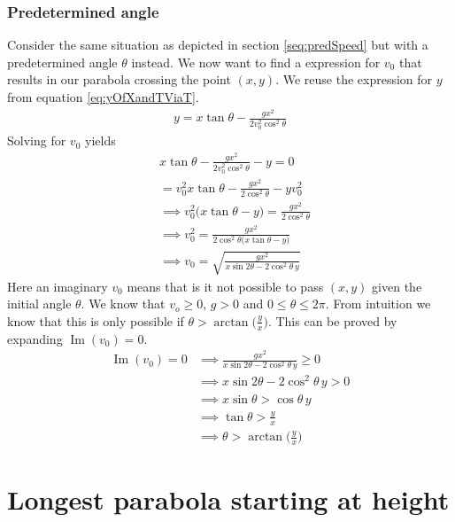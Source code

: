 \documentclass[%
aip,
jmp,
amsmath,amssymb,
reprint,%
]{revtex4-1}
\begin{document}
	\subsubsection{Predetermined angle}
	Consider the same situation as depicted in section \ref{seq:predSpeed} but with a predetermined angle $\theta$ instead. We now want to find a expression for $v_0$ that results in our parabola crossing the point $(x,y)$. We reuse the expression for $y$ from equation \eqref{eq:yOfXandTViaT}.
	\begin{align}\nonumber
		y = x\tan\theta - \frac{gx^2}{2v_{0}^2\cos^2\theta}
	\end{align}
	Solving for $v_0$ yields
	\begin{align}\nonumber
		&x\tan\theta - \frac{gx^2}{2v_{0}^2\cos^2\theta}-y = 0\\\nonumber
		&= v_{0}^2x\tan\theta-\frac{gx^2}{2\cos^2\theta}-yv_{0}^2\\\nonumber
		&\implies v_{0}^2\big(x\tan\theta-y\big)=\frac{gx^2}{2\cos^2\theta} \\\nonumber
		&\implies v_{0}^2=\frac{gx^2}{2\cos^2\theta\big(x\tan\theta-y\big)} \\\nonumber
		&\implies v_0 = \sqrt{\frac{gx^2}{x\sin2\theta-2\cos^2\theta\,y}}\nonumber
	\end{align}
	Here an imaginary $v_0$ means that is it not possible to pass $(x, y)$ given the initial angle $\theta$. We know that $v_o \geq 0$, $g > 0$ and $0 \leq \theta \leq 2\pi$. From intuition we know that this is only possible if $\theta > \arctan\big(\frac{y}{x}\big)$. This can be proved by expanding $\operatorname{Im}(v_0) = 0$.
	\begin{align}\nonumber
		\operatorname{Im}(v_0) = 0 &\implies \frac{gx^2}{x\sin2\theta-2\cos^2\theta\,y} \geq 0 \\\nonumber
		&\implies x\sin2\theta-2\cos^2\theta\,y > 0\\\nonumber
		&\implies x\sin\theta > \cos\theta\,y\\\nonumber
		&\implies \tan\theta > \frac{y}{x}\\\nonumber
		&\implies \theta > \arctan\Big(\frac{y}{x}\Big)
	\end{align}
	\section{Longest parabola starting at height}
\end{document}
